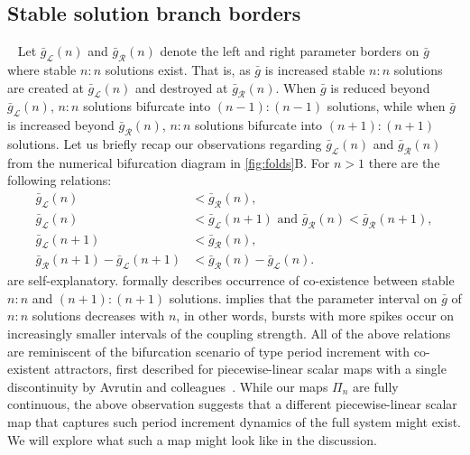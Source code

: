 \documentclass[utf8]{frontiersFPHY} %
\begin{document}
\subsection{Stable solution branch borders}
~\label{sec:borders}
Let $\bar g_{\mathcal{L}}(n)$ and $\bar g_{\mathcal{R}}(n)$ denote the left and right parameter borders on $\bar g$ where stable $n:n$ solutions exist.
That is, as $\bar g$ is increased stable $n:n$ solutions are created at $\bar g_{\mathcal{L}}(n)$ and destroyed at $\bar g_{\mathcal{R}}(n)$.
When $\bar g$ is reduced beyond $\bar g_{\mathcal{L}}(n)$, $n:n$ solutions bifurcate into $(n-1):(n-1)$ solutions, while when $\bar g$ is increased beyond $\bar g_{\mathcal{R}}(n)$, $n:n$ solutions bifurcate into $(n+1):(n+1)$ solutions.
Let us briefly recap our observations regarding $\bar g_{\mathcal{L}}(n)$ and $\bar g_{\mathcal{R}}(n)$ from the numerical bifurcation diagram in \cref{fig:folds}B.
For $n>1$ there are the following relations:
\begin{align}
	\bar g_{\mathcal{L}}(n)                               & < \bar g_{\mathcal{R}}(n)\label{eq:easy1},                                                                 \\
	\bar g_{\mathcal{L}}(n)                               & < \bar g_{\mathcal{L}}(n+1)\text{ and } \bar g_{\mathcal{R}}(n)<\bar g_{\mathcal{R}}(n+1)\label{eq:easy2}, \\
	\bar g_{\mathcal{L}}(n+1)                             & < \bar g_{\mathcal{R}}(n)\label{eq:coexistence},                                                           \\
	\bar g_{\mathcal{R}}(n+1) - \bar g_{\mathcal{L}}(n+1) & < \bar g_{\mathcal{R}}(n) - \bar g_{\mathcal{L}}(n)\label{eq:robustness}.
\end{align}
 are self-explanatory.
 formally describes occurrence of co-existence between stable $n:n$ and $(n+1):(n+1)$ solutions.
 implies that the parameter interval on $\bar g$ of $n:n$ solutions decreases with $n$, in other words, bursts with more spikes occur on increasingly smaller intervals of the coupling strength.
All of the above relations are reminiscent of the bifurcation scenario of type period increment with co-existent attractors, first described for piecewise-linear scalar maps with a single discontinuity by Avrutin and colleagues~\cite[e.g.
	see][]{gardini2012,tramontana2012,avrutin2011}.
While our maps $\Pi_n$ are fully continuous, the above observation suggests that a different piecewise-linear scalar map that captures such period increment dynamics of the full system might exist.
We will explore what such a map might look like in the discussion.
\end{document}
